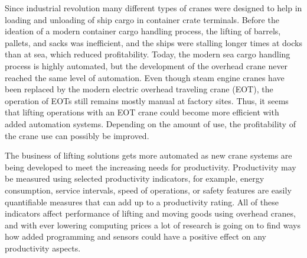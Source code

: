 \documentclass[12pt,a4paper,oneside,pdftex]{report}
\begin{document}
Since industrial revolution many different types of cranes were designed to help in loading and unloading of ship cargo in container crate terminals. Before the ideation of a modern container cargo handling process, the lifting of barrels, pallets, and sacks was inefficient, and the ships were stalling longer times at docks than at sea, which reduced profitability. Today, the modern sea cargo handling process is highly automated, but the development of the overhead crane never reached the same level of automation. Even though steam engine cranes have been replaced by the modern electric overhead traveling crane (EOT), the operation of EOTs still remains mostly manual at factory sites. Thus, it seems that lifting operations with an EOT crane could become more efficient with added automation systems. Depending on the amount of use, the profitability of the crane use can possibly be improved. \citep{Zrni04}

The business of lifting solutions gets more automated as new crane systems are being developed to meet the increasing needs for productivity. Productivity may be measured using selected productivity indicators, for example, energy consumption, service intervals, speed of operations, or safety features are easily quantifiable measures that can add up to a productivity rating. All of these indicators affect performance of lifting and moving goods using overhead cranes, and with ever lowering computing prices a lot of research is going on to find ways how added programming and sensors could have a positive effect on any productivity aspects.


\end{document}
